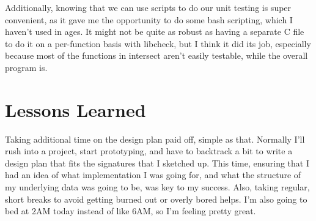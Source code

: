\documentclass[11pt]{report}
\begin{document}
Additionally, knowing that we can use scripts to do our unit testing is super convenient, as it gave me the opportunity to do some bash scripting, which I haven't used in ages. It might not be quite as robust as having a separate C file to do it on a per-function basis with libcheck, but I think it did its job, especially because most of the functions in intersect aren't easily testable, while the overall program is.
\pagebreak
\section*{Lessons Learned}
Taking additional time on the design plan paid off, simple as that. Normally I'll rush into a project, start prototyping, and have to backtrack a bit to write a design plan that fits the signatures that I sketched up. This time, ensuring that I had an idea of what implementation I was going for, and what the structure of my underlying data was going to be, was key to my success. Also, taking regular, short breaks to avoid getting burned out or overly bored helps. I'm also going to bed at 2AM today instead of like 6AM, so I'm feeling pretty great.
\end{document}
